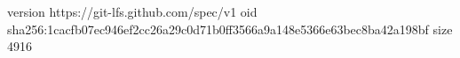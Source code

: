 version https://git-lfs.github.com/spec/v1
oid sha256:1cacfb07ec946ef2cc26a29c0d71b0ff3566a9a148e5366e63bec8ba42a198bf
size 4916
